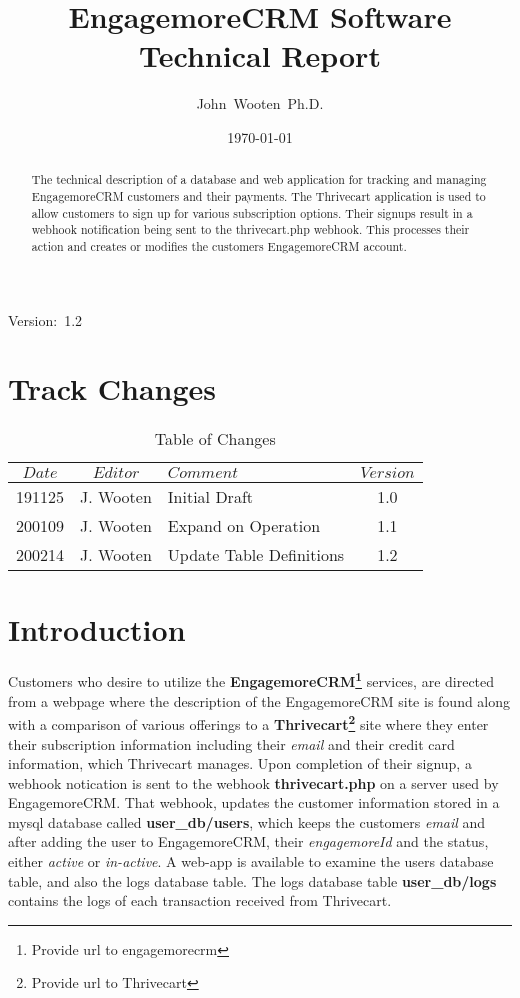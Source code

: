 \documentclass[final,letterpaper,12pt]{article}
\author{John~Wooten~Ph.D.\\
}
\date{\today \\
}
\title{EngagemoreCRM Software Technical Report		}
\begin{document}
\maketitle
\begin{center}
Version:~1.2
\end{center}

\begin {abstract}
\noindent The technical description of a database and web application
for tracking and managing EngagemoreCRM customers and their payments.
The Thrivecart application is used to allow customers to sign up for various
subscription options.  Their signups result in a webhook notification being sent to
the thrivecart.php webhook.  This processes their action and creates or modifies
the customers EngagemoreCRM account.
\end{abstract}
\newpage
\tableofcontents
\newpage
\listoffigures
\listoftables

\newpage
\section{Track Changes}
\begin{table}[h]
\begin{center}
\begin{tabular}{|c|c|l|c|} \hline
$ Date $ & $Editor$ & $Comment$ & $Version$ \\
\hline
191125 & J. Wooten & Initial Draft & 1.0  \\
200109 & J. Wooten & Expand on Operation & 1.1 \\
200214 & J. Wooten & Update Table Definitions & 1.2 \\

\hline
\end{tabular}
\end{center}
\caption {Table of Changes}
\label{tab:cqdata0}
\end{table}

\newpage
\section{Introduction}
\noindent Customers who desire to utilize the {\bf EngagemoreCRM\footnote{Provide url to engagemorecrm}} services, are directed from a webpage
where the description of the EngagemoreCRM site is found along with a comparison of various offerings
to a {\bf Thrivecart\footnote{Provide url to Thrivecart}} site where they enter their subscription information including their {\it email} and their credit card information, which Thrivecart manages.
Upon completion of their signup, a webhook notication is sent to the webhook {\bf thrivecart.php} on
a server used by EngagemoreCRM.  That webhook, updates the customer information stored in a mysql
database called {\bf user\_db/users}, which keeps the customers {\it email} and after adding the user to EngagemoreCRM,
their {\it engagemoreId} and the status, either {\it active} or {\it in-active}.  A web-app is available to examine the users database table, and also
the logs database table. The logs database table {\bf user\_db/logs} contains the logs of each transaction received
from Thrivecart.
\end{document}
